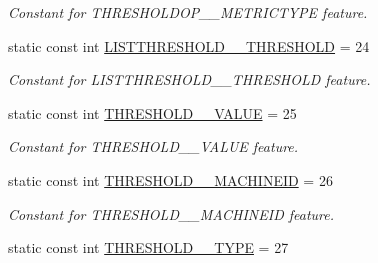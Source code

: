 \begin{DoxyCompactItemize}
\begin{DoxyCompactList}\small\item\em Constant for THRESHOLDOP\_\-\_\-METRICTYPE feature. \item\end{DoxyCompactList}\item 
\hypertarget{classIMS__Data_1_1IMS__DataPackage_a023bf54a520f82a4b69cca294d3c2382}{
static const int \hyperlink{classIMS__Data_1_1IMS__DataPackage_a023bf54a520f82a4b69cca294d3c2382}{LISTTHRESHOLD\_\-\_\-THRESHOLD} = 24}
\label{classIMS__Data_1_1IMS__DataPackage_a023bf54a520f82a4b69cca294d3c2382}

\begin{DoxyCompactList}\small\item\em Constant for LISTTHRESHOLD\_\-\_\-THRESHOLD feature. \item\end{DoxyCompactList}\item 
\hypertarget{classIMS__Data_1_1IMS__DataPackage_ae04f59f5bb34a6f0dca3c174206f5fb3}{
static const int \hyperlink{classIMS__Data_1_1IMS__DataPackage_ae04f59f5bb34a6f0dca3c174206f5fb3}{THRESHOLD\_\-\_\-VALUE} = 25}
\label{classIMS__Data_1_1IMS__DataPackage_ae04f59f5bb34a6f0dca3c174206f5fb3}

\begin{DoxyCompactList}\small\item\em Constant for THRESHOLD\_\-\_\-VALUE feature. \item\end{DoxyCompactList}\item 
\hypertarget{classIMS__Data_1_1IMS__DataPackage_a0724ad7a36dec1f5bab89e976d35612e}{
static const int \hyperlink{classIMS__Data_1_1IMS__DataPackage_a0724ad7a36dec1f5bab89e976d35612e}{THRESHOLD\_\-\_\-MACHINEID} = 26}
\label{classIMS__Data_1_1IMS__DataPackage_a0724ad7a36dec1f5bab89e976d35612e}

\begin{DoxyCompactList}\small\item\em Constant for THRESHOLD\_\-\_\-MACHINEID feature. \item\end{DoxyCompactList}\item 
\hypertarget{classIMS__Data_1_1IMS__DataPackage_af1b0ffe01e65ae154b2eab1b0bc1c8cf}{
static const int \hyperlink{classIMS__Data_1_1IMS__DataPackage_af1b0ffe01e65ae154b2eab1b0bc1c8cf}{THRESHOLD\_\-\_\-TYPE} = 27}
\label{classIMS__Data_1_1IMS__DataPackage_af1b0ffe01e65ae154b2eab1b0bc1c8cf}


\end{DoxyCompactItemize}
